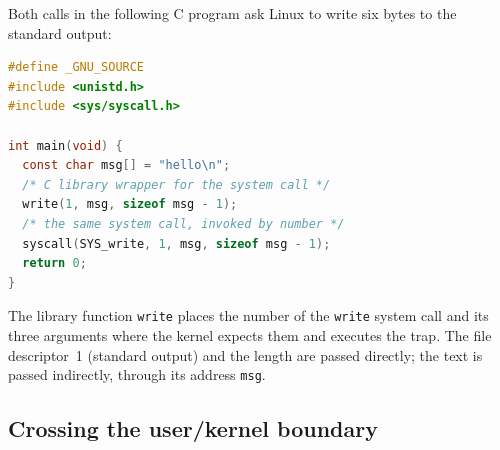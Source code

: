 \documentclass[../main.tex]{subfiles}
\begin{document}
\begin{example}
  Both calls in the following C program ask Linux to write six bytes to
  the standard output:
  \begin{lstlisting}[language=C, numbers=none]
#define _GNU_SOURCE
#include <unistd.h>
#include <sys/syscall.h>

int main(void) {
  const char msg[] = "hello\n";
  /* C library wrapper for the system call */
  write(1, msg, sizeof msg - 1);
  /* the same system call, invoked by number */
  syscall(SYS_write, 1, msg, sizeof msg - 1);
  return 0;
}
\end{lstlisting}
  The library function \texttt{write} places the number of the
  \texttt{write} system call and its three arguments where the kernel
  expects them and executes the trap.  The file descriptor~1 (standard
  output) and the length are passed directly; the text is passed
  indirectly, through its address \texttt{msg}.
\end{example}

\subsection{Crossing the user/kernel boundary}
\end{document}
